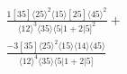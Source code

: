 \documentclass[varwidth, border=5pt]{standalone}
\begin{document}
\begin{my}
$\begin{gathered}
\scriptscriptstyle\frac{1[35]⟨25⟩^2⟨15⟩[25]⟨45⟩^2}{⟨12⟩^3⟨35⟩⟨5|1+2|5]^2}+\\
\scriptscriptstyle\frac{-3[35]⟨25⟩^2⟨15⟩⟨14⟩⟨45⟩}{⟨12⟩^4⟨35⟩⟨5|1+2|5]}\phantom{+}
\end{gathered}$
\end{my}
\end{document}
